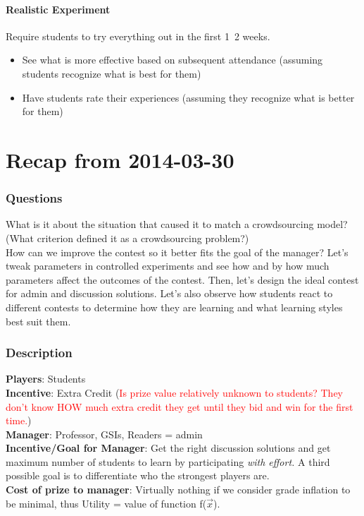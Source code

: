 \documentclass[leqno]{article}
\begin{document}
\subsection{Realistic Experiment}
Require students to try everything out in the first 1~2 weeks.
\begin{itemize}
\item See what is more effective based on subsequent attendance (assuming students recognize what is best for them)
\item Have students rate their experiences (assuming they recognize what is better for them)
\end{itemize}

\part*{Recap from 2014-03-30}
\section{Questions}
What is it about the situation that caused it to match a crowdsourcing model? (What criterion defined it as a crowdsourcing problem?)\\
How can we improve the contest so it better fits the goal of the manager? Let's tweak parameters in controlled experiments and see how and by how much parameters affect the outcomes of the contest. Then, let's design the ideal contest for admin and discussion solutions. Let's also observe how students react to different contests to determine how they are learning and what learning styles best suit them.

\section{Description}
\textbf{Players}: Students\\
\textbf{Incentive}: Extra Credit (\textcolor{red}{Is prize value relatively unknown to students? They don't know HOW much extra credit they get until they bid and win for the first time.})\\
\textbf{Manager}: Professor, GSIs, Readers = admin\\
\textbf{Incentive/Goal for Manager}: Get the right discussion solutions and get maximum number of students to learn by participating \emph{with effort.} A third possible goal is to differentiate who the strongest players are.\\
\textbf{Cost of prize to manager}: Virtually nothing if we consider grade inflation to be minimal, thus Utility = value of function f($\overrightarrow{x}$).\\
\end{document}

